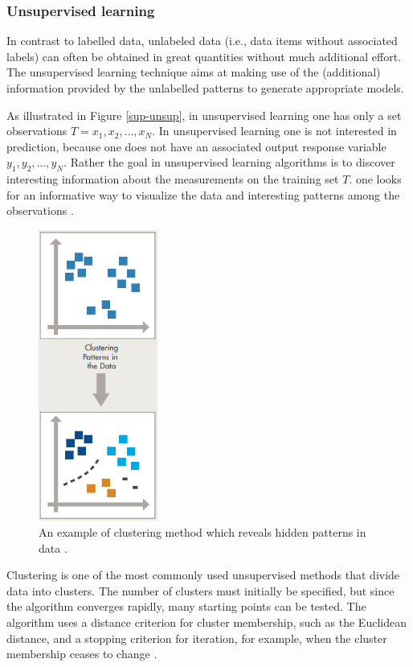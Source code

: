 \subsubsection{Unsupervised learning}

In contrast to labelled data, unlabeled data (i.e., data items without associated labels) can often be obtained in great quantities without much additional effort. The unsupervised learning technique aims at making use of the (additional) information provided by the unlabelled patterns to generate appropriate models. 

As illustrated in Figure \ref{sup-unsup}, in unsupervised learning one has only a set observations $T=x_1,x_2,\dots, x_N$. In unsupervised learning one is not interested in prediction, because one does not have an associated output response variable $y_1,y_2,\dots, y_N$. Rather the goal in unsupervised learning algorithms is to discover interesting information about the measurements on the training set $T$. one looks for an informative way to visualize the data and interesting patterns among the observations \citep{james2013introduction}. 

\begin{figure}[H]
  \centering
    \includegraphics[width=0.35\textwidth]{images/cluster.png}
    \caption{An example of clustering method which reveals hidden patterns in data \citep{Machinelearning}.}
  \label{datagrowth.png}
\end{figure}

Clustering is one of the most commonly used unsupervised methods that divide data into clusters. The number of clusters must initially be specified, but since the algorithm converges rapidly, many starting points can be tested. The algorithm uses a distance
criterion for cluster membership, such as the Euclidean distance, and a stopping criterion for iteration, for example, when the cluster membership ceases to change \citep{ball2010data}.

